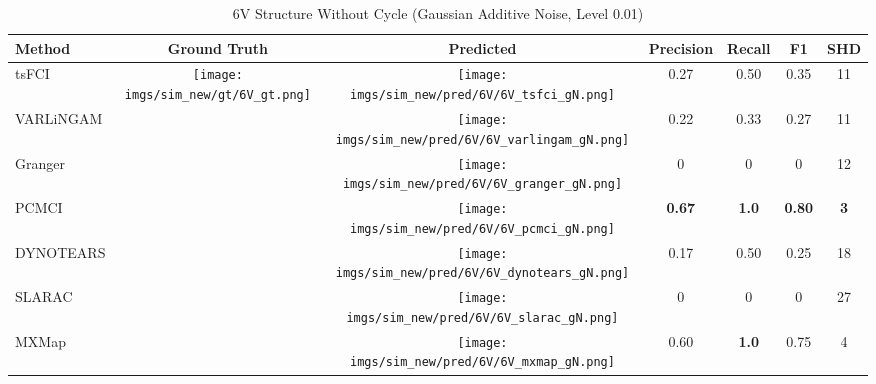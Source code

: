 \begin{table}[htb]
\begin{tabular}{l|c|c|c|c|c|c}
Method    & Ground Truth      & Predicted & Precision     & Recall       & F1            & SHD        \\ \hline
tsFCI     & \multirow{7}{*}[-16em]{\begin{minipage}{.17\linewidth} \centering \texttt{[image: imgs/sim\_new/gt/6V\_gt.png]} \end{minipage}} &  \begin{minipage}{.17\linewidth} \centering \texttt{[image: imgs/sim\_new/pred/6V/6V\_tsfci\_gN.png]} \end{minipage}   & 0.27          & 0.50         & 0.35          & 11         \\
VARLiNGAM &                   &  \begin{minipage}{.17\linewidth} \centering \texttt{[image: imgs/sim\_new/pred/6V/6V\_varlingam\_gN.png]} \end{minipage}    & 0.22          & 0.33         & 0.27          & 11         \\
Granger   &                   & \begin{minipage}{.17\linewidth} \centering \texttt{[image: imgs/sim\_new/pred/6V/6V\_granger\_gN.png]} \end{minipage}   & 0             & 0            & 0             & 12         \\
PCMCI     &                   & \begin{minipage}{.17\linewidth} \centering \texttt{[image: imgs/sim\_new/pred/6V/6V\_pcmci\_gN.png]} \end{minipage}   & \textbf{0.67} & \textbf{1.0} & \textbf{0.80} & \textbf{3} \\
DYNOTEARS &                   & \begin{minipage}{.17\linewidth} \centering \texttt{[image: imgs/sim\_new/pred/6V/6V\_dynotears\_gN.png]} \end{minipage}   & 0.17          & 0.50         & 0.25          & 18         \\
SLARAC    &                   & \begin{minipage}{.17\linewidth} \centering \texttt{[image: imgs/sim\_new/pred/6V/6V\_slarac\_gN.png]} \end{minipage}     & 0             & 0            & 0             & 27         \\ \cline{1-1} \cline{3-7} 
MXMap     &                   &  \begin{minipage}{.17\linewidth} \centering \texttt{[image: imgs/sim\_new/pred/6V/6V\_mxmap\_gN.png]} \end{minipage}   & 0.60          & \textbf{1.0} & 0.75          & 4         
\end{tabular}
\caption{6V Structure Without Cycle (Gaussian Additive Noise, Level 0.01)}
\label{tab:6V_gN}
\end{table}

